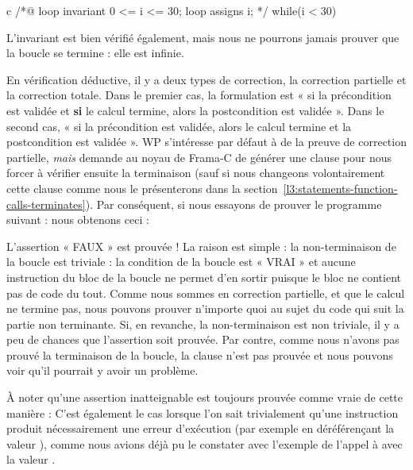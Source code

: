 \begin{CodeBlock}{c}
/*@
  loop invariant 0 <= i <= 30;
  loop assigns i;
*/
while(i < 30){

}
\end{CodeBlock}



L'invariant est bien vérifié également, mais nous ne pourrons jamais prouver
que la boucle se termine : elle est infinie.



\label{l3:statements-loops-variant}


En vérification déductive, il y a deux types de correction, la correction
partielle et la correction totale. Dans le premier cas, la formulation est
« si la précondition est validée et \textbf{si} le calcul termine, alors la
postcondition est validée ». Dans le second cas, « si la précondition est
validée, alors le calcul termine et la postcondition est validée ». WP
s'intéresse par défaut à de la preuve de correction partielle, \textit{mais}
demande au noyau de Frama-C de générer une clause  pour
nous forcer à vérifier ensuite la terminaison (sauf si nous changeons
volontairement cette clause comme nous le présenterons dans la
section~\ref{l3:statements-function-calls-terminates}). Par conséquent, si nous
essayons de prouver le programme suivant :
nous obtenons ceci :


L'assertion « FAUX » est prouvée ! La raison est simple : la non-terminaison de
la boucle est triviale : la condition de la boucle est « VRAI » et aucune instruction
du bloc de la boucle ne permet d'en sortir puisque le bloc ne contient pas de code du
tout. Comme nous sommes en correction partielle, et que le calcul ne termine pas, nous
pouvons prouver n'importe quoi au sujet du code qui suit la partie non terminante. Si,
en revanche, la non-terminaison est non triviale, il y a peu de chances que l'assertion
soit prouvée. Par contre, comme nous n'avons pas prouvé la terminaison de la
boucle, la clause  n'est pas prouvée et nous pouvons voir
qu'il pourrait y avoir un problème.



\begin{Information}
  À noter qu'une assertion inatteignable est toujours prouvée comme vraie de
  cette manière :
  C'est également le cas lorsque l'on sait trivialement qu'une instruction
  produit nécessairement une erreur d'exécution (par exemple en déréférençant
  la valeur ), comme nous avions déjà pu le constater avec
  l'exemple de l'appel à  avec la valeur .
\end{Information}


